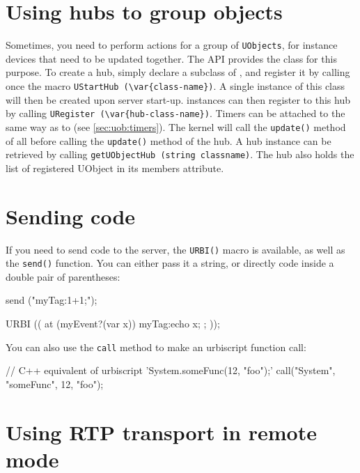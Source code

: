 \section{Using hubs to group objects}

Sometimes, you need to perform actions for a group of \lstinline{UObjects},
for instance devices that need to be updated together. The API provides the
\UObjectHub class for this purpose. To create a hub, simply declare a
subclass of \UObjectHub, and register it by calling once the macro
\lstinline|UStartHub (\var{class-name})|. A single instance of this class
will then be created upon server start-up. \UObject instances can then
register to this hub by calling %
\lstinline|URegister (\var{hub-class-name})|. %
Timers can be attached to \UObjectHub the same way as to \UObject (see
\autoref{sec:uob:timers}). The kernel will call the \lstinline{update()}
method of all \UObject before calling the \lstinline{update()} method of the
hub. A hub instance can be retrieved by calling
\lstinline{getUObjectHub (string classname)}. The hub also holds the list of
registered UObject in its members attribute.

\section{Sending \us code}

If you need to send \us code to the server, the \lstinline{URBI()}
macro is available, as well as the \lstinline{send()} function. You
can either pass it a string, or directly \urbi code inside a double
pair of parentheses:

\begin{urbiunchecked}
send ("myTag:1+1;");

URBI (( at (myEvent?(var x)) { myTag:echo x; }; ));
\end{urbiunchecked}

You can also use the \lstinline{call} method to make an urbiscript function
call:

\begin{urbiunchecked}
// C++ equivalent of urbiscript 'System.someFunc(12, "foo");'
call("System", "someFunc", 12, "foo");
\end{urbiunchecked}

\section{Using RTP transport in remote mode}
\label{sec:uob:api:rtp}

